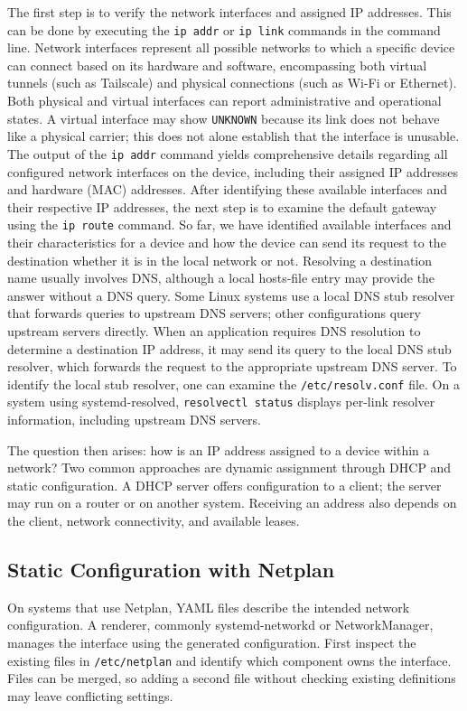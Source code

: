 \documentclass[journal]{IEEEtran}
\begin{document}
The first step is to verify the network interfaces and assigned IP addresses. This can be done by executing the \texttt{ip addr} or \texttt{ip link} commands in the command line. Network interfaces represent all possible networks to which a specific device can connect based on its hardware and software, encompassing both virtual tunnels (such as Tailscale) and physical connections (such as Wi-Fi or Ethernet). Both physical and virtual interfaces can report administrative and operational states. A virtual interface may show \texttt{UNKNOWN} because its link does not behave like a physical carrier; this does not alone establish that the interface is unusable. The output of the \texttt{ip addr} command yields comprehensive details regarding all configured network interfaces on the device, including their assigned IP addresses and hardware (MAC) addresses. After identifying these available interfaces and their respective IP addresses, the next step is to examine the default gateway using the \texttt{ip route} command. So far, we have identified available interfaces and their characteristics for a device and how the device can send its request to  the destination whether it is in the local network or not. Resolving a destination name usually involves DNS, although a local hosts-file entry may provide the answer without a DNS query. Some Linux systems use a local DNS stub resolver that forwards queries to upstream DNS servers; other configurations query upstream servers directly. When an application requires DNS resolution to determine a destination IP address, it may send its query to the local DNS stub resolver, which forwards the request to the appropriate upstream DNS server. To identify the local stub resolver, one can examine the \texttt{/etc/resolv.conf} file. On a system using systemd-resolved, \texttt{resolvectl status} displays per-link resolver information, including upstream DNS servers.


The question then arises: how is an IP address assigned to a device within a network? Two common approaches are dynamic assignment through DHCP and static configuration. A DHCP server offers configuration to a client; the server may run on a router or on another system. Receiving an address also depends on the client, network connectivity, and available leases.

\subsection{Static Configuration with Netplan}
On systems that use Netplan, YAML files describe the intended network configuration. A renderer, commonly systemd-networkd or NetworkManager, manages the interface using the generated configuration. First inspect the existing files in \texttt{/etc/netplan} and identify which component owns the interface. Files can be merged, so adding a second file without checking existing definitions may leave conflicting settings.
\end{document}
